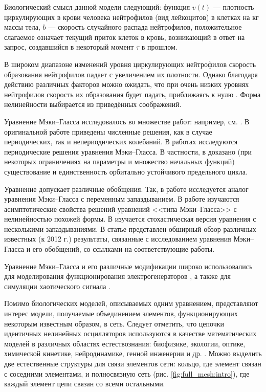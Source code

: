 Биологический смысл данной модели следующий: функция $v(t)$ --- плотность циркулирующих в крови человека нейтрофилов (вид лейкоцитов) в клетках на кг массы тела, $b$ --- скорость случайного распада нейтрофилов, положительное слагаемое означает текущий приток клеток в кровь, возникающий в ответ на запрос, создавшийся в некоторый момент $\tau$ в прошлом.

В широком диапазоне изменений уровня циркулирующих нейтрофилов скорость образования нейтрофилов падает с увеличением их плотности. Однако благодаря действию различных факторов можно ожидать, что при очень низких уровнях нейтрофилов скорость их образования будет падать, приближаясь к нулю \cite[с. 85]{Mackey1977}. Форма нелинейности выбирается из приведённых соображений.

Уравнение Мэки--Гласса исследовалось во множестве работ: например, см. \cite{Junges2012, Su2011, Wu2007, Kubyshkin2016, Krisztin2020, Bartha2021}. В оригинальной работе \cite{Mackey1977} приведены численные решения, как в случае периодических, так и непериодических колебаний. В работах \cite{Krisztin2020, Bartha2021} исследуются периодические решения уравнения Мэки--Гласса. В частности, в \cite{Bartha2021} доказано (при некоторых ограничениях на параметры и множество начальных функций) существование и единственность орбитально устойчивого предельного цикла.

Уравнение допускает различные обобщения. Так, в работе \cite{Berezansky2006} исследуется аналог уравнения Мэки--Гласса с переменным запаздыванием. В работе \cite{Liz2002} изучаются асимптотические свойства решений уравнений <<типа Мэки--Гласса>> с нелинейностью похожей формы. В \cite{Huang2024} изучается стохастическая версия уравнения с несколькими запаздываниями. В статье \cite{Berezansky2012} представлен обширный обзор различных известных (к 2012 г.) результаты, связанные с исследованием уравнения Мэки--Гласса и его обобщений, со ссылками на соответствующие работы.

Уравнение Мэки--Гласса и его различные модификации широко использовались для моделирования функционирования электрогенераторов \cite{Tateno2012, Namajunas1995, Glyzin2018, Glyzin2018a}, а также для симуляции хаотического сигнала \cite{Grassberger1983, Amil2015, Amil2015a, Shahverdiev2006}.

Помимо биологических моделей, описываемых одним уравнением, представляют интерес модели, получаемые объединением элементов, функционирующих некоторым известным образом, в сеть. Следует отметить, что цепочки идентичных нелинейных осцилляторов используются в качестве математических моделей в различных областях естествознания: биофизике, экологии, оптике, химической кинетике, нейродинамике, генной инженерии и др. \cite{Glyzin2022}. Можно выделить две естественные структуры для связи элементов сети: кольцо, где элемент связан с соседними элементами, и полносвязную сеть (рис. \ref{fig:full_mesh:intro}), где каждый элемент цепи связан со всеми остальными.

